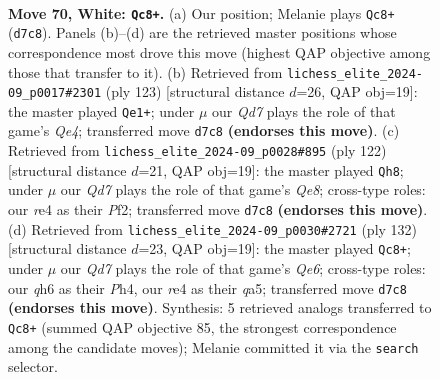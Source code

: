 \documentclass[11pt]{article}
\begin{document}
\clearpage

\begin{figure}[p]\centering
\begin{subfigure}{0.46\textwidth}\centering
\resizebox{\linewidth}{!}{%
\newchessgame
\chessboard[
  setfen={7k/3Q4/5p1q/3p4/4r3/6P1/6KP/8 w - - 20 70},
  showmover=false,
  pgfstyle=straightmove, color=movearrow, markmove={d7-c8}
]}
\caption{}
\end{subfigure}\hfill
\begin{subfigure}{0.46\textwidth}\centering
\resizebox{\linewidth}{!}{%
\newchessgame
\chessboard[
  setfen={8/1P6/2Q5/4qppk/8/2P5/8/7K b - - 16 62},
  showmover=false,
  pgfstyle=straightmove, color=movearrow, markmove={e5-e1}
]}
\caption{}
\end{subfigure}
\\[4pt]
\begin{subfigure}{0.46\textwidth}\centering
\resizebox{\linewidth}{!}{%
\newchessgame
\chessboard[
  setfen={4Q3/2k5/q3p3/8/8/1P6/2P2P2/2K5 w - - 4 62},
  showmover=false,
  pgfstyle=straightmove, color=movearrow, markmove={e8-h8}
]}
\caption{}
\end{subfigure}\hfill
\begin{subfigure}{0.46\textwidth}\centering
\resizebox{\linewidth}{!}{%
\newchessgame
\chessboard[
  setfen={7k/8/4Q1pp/q7/7P/6P1/3p1PK1/8 w - - 21 67},
  showmover=false,
  pgfstyle=straightmove, color=movearrow, markmove={e6-c8}
]}
\caption{}
\end{subfigure}
\caption{\textbf{Move 70, White: \texttt{Qc8+}.} (a) Our position; Melanie plays \texttt{Qc8+} (\texttt{d7c8}). Panels (b)--(d) are the retrieved master positions whose correspondence most drove this move (highest QAP objective among those that transfer to it). (b) Retrieved from \texttt{lichess\_elite\_2024-09\_p0017\#2301} (ply 123) [structural distance $d$=26, QAP obj=19]: the master played \texttt{Qe1+}; under $\mu$ our \emph{Qd7} plays the role of that game's \emph{Qe4}; transferred move \texttt{d7c8} \textbf{(endorses this move)}. (c) Retrieved from \texttt{lichess\_elite\_2024-09\_p0028\#895} (ply 122) [structural distance $d$=21, QAP obj=19]: the master played \texttt{Qh8}; under $\mu$ our \emph{Qd7} plays the role of that game's \emph{Qe8}; cross-type roles: our \emph{r}e4 as their \emph{P}f2; transferred move \texttt{d7c8} \textbf{(endorses this move)}. (d) Retrieved from \texttt{lichess\_elite\_2024-09\_p0030\#2721} (ply 132) [structural distance $d$=23, QAP obj=19]: the master played \texttt{Qc8+}; under $\mu$ our \emph{Qd7} plays the role of that game's \emph{Qe6}; cross-type roles: our \emph{q}h6 as their \emph{P}h4, our \emph{r}e4 as their \emph{q}a5; transferred move \texttt{d7c8} \textbf{(endorses this move)}. Synthesis: 5 retrieved analogs transferred to \texttt{Qc8+} (summed QAP objective 85, the strongest correspondence among the candidate moves); Melanie committed it via the \texttt{search} selector.}
\label{fig:thought-m138}
\end{figure}
\end{document}
